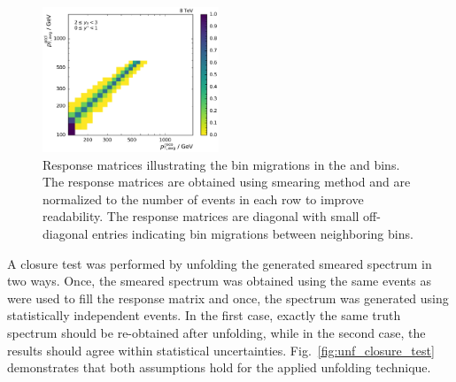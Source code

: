 \begin{figure}[htp]
    \includegraphics[width=0.47\textwidth]{figures/measurement/res_matrix_ptavg_normalized_yb2ys0.pdf}
    \caption[Response matrix used for the unfolding]{Response matrices
        illustrating the bin migrations in the \ystar and \yboost bins. The
        response matrices are obtained using smearing method and are normalized
        to the number of events in each row to improve readability. The response
        matrices are diagonal with small off-diagonal entries indicating bin
    migrations between neighboring bins.}
    \label{fig:res_matrix}
\end{figure}

A closure test was performed by unfolding the generated smeared spectrum in two
ways. Once, the smeared spectrum was obtained using the same events as were used
to fill the response matrix and once, the spectrum was generated using
statistically independent events. In the first case, exactly the same truth spectrum should
be re-obtained after unfolding, while in the second case, the results should
agree within statistical uncertainties. Fig.~\ref{fig:unf_closure_test} demonstrates that both
assumptions hold for the applied unfolding technique.

